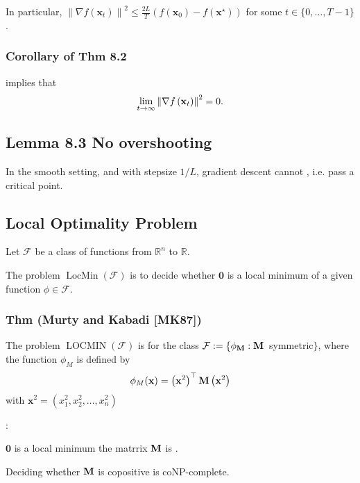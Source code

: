 In particular, $\left\|\nabla f\left(\mathbf{x}_{t}\right)\right\|^{2} \leq \frac{2 L}{T}\left(f\left(\mathbf{x}_{0}\right)-f\left(\mathbf{x}^{\star}\right)\right)$ for some $t \in\{0, \ldots, T-1\}$. 

\subsubsection*{Corollary of Thm 8.2}
 implies that
$$
\lim _{t \rightarrow \infty}\left\|\nabla f\left(\operatorname{\boldsymbol{\mathbf{x}}}_{t}\right)\right\|^{2}=0 .
$$





\subsection*{Lemma 8.3 No overshooting}
In the smooth setting, and with stepsize $1 / L$, gradient descent cannot , i.e. pass a critical point.






\subsection*{Local Optimality Problem}
Let $\mathcal{F}$ be a class of functions from $\mathbb{R}^{n}$ to $\mathbb{R}$.

The problem $\operatorname{LocMin}(\mathcal{F})$ is to decide whether $\mathbf{0}$ is a local minimum of a given function $\phi \in \mathcal{F}$.

\subsubsection*{Thm (Murty and Kabadi [MK87])}
The problem $\operatorname{LOCMIN}(\mathcal{F})$ is  for the class $\mathcal{F}:=\left\{\phi_{\operatorname{\boldsymbol{\mathbf{M}}}}: \operatorname{\boldsymbol{\mathbf{M}}}\right.$ symmetric$\}$, where the function $\phi_{M}$ is defined by
$$
\phi_{M}(\mathbf{x})=\left(\mathbf{x}^{2}\right)^{\top} \operatorname{\boldsymbol{\mathbf{M}}}\left(\mathbf{x}^{2}\right)
$$
with $\mathbf{x}^{2}=\left(x_{1}^{2}, x_{2}^{2}, \ldots, x_{n}^{2}\right)$


:

$\mathbf{0}$ is a local minimum  the matrrix $\operatorname{\boldsymbol{\mathbf{M}}}$ is .

Deciding whether $\operatorname{\boldsymbol{\mathbf{M}}}$ is copositive is coNP-complete.








